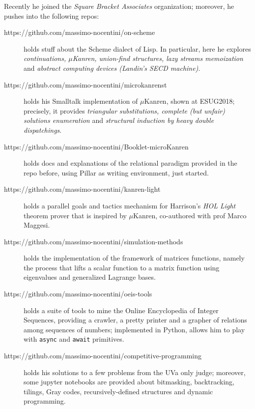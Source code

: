 \documentclass[a4paper]{tufte-handout}
\begin{document}
    Recently he joined the \textit{Square Bracket Associates} organization; moreover,
    he pushes into the following repos:
    \begin{description}
        \item[https://github.com/massimo-nocentini/on-scheme] holds stuff about
        the Scheme dialect of Lisp. In particular, here he explores
        \textit{continuations, $\mu$Kanren, union-find structures, lazy streams
        memoization} and \textit{abstract computing devices (Landin's SECD machine)}.

        \item[https://github.com/massimo-nocentini/microkanrenst] holds his
        Smalltalk implementation of $\mu$Kanren, shown at ESUG2018; precisely,
        it provides \textit{triangular substitutions, complete (but unfair)
        solutions enumeration} and \textit{structural induction by heavy double
        dispatchings}.

        \item[https://github.com/massimo-nocentini/Booklet-microKanren] holds
        docs and explanations of the relational paradigm provided in the repo before,
        using Pillar as writing environment, just started.

        \item[https://github.com/massimo-nocentini/kanren-light] holds a
        parallel goals and tactics mechanism for Harrison's \textit{HOL Light}
        theorem prover that is inspired by $\mu$Kanren, co-authored with prof
        Marco Maggesi.

        \item[https://github.com/massimo-nocentini/simulation-methods] holds
        the implementation of the framework of matrices functions, namely the
        process that lifts a scalar function to a matrix function using
        eigenvalues and generalized Lagrange bases.

        \item[https://github.com/massimo-nocentini/oeis-tools] holds a suite of tools
        to mine the Online Encyclopedia of Integer Sequences, providing a crawler,
        a pretty printer and a grapher of relations among sequences of numbers; implemented
        in Python, allows him to play with \verb|async| and \verb|await| primitives.

        \item[https://github.com/massimo-nocentini/competitive-programming]
        holds his solutions to a few problems from the UVa only judge;
        moreover, some jupyter notebooks are provided about bitmasking,
        backtracking, tilings, Gray codes, recursively-defined structures and
        dynamic programming.


\end{description}
\end{document}
